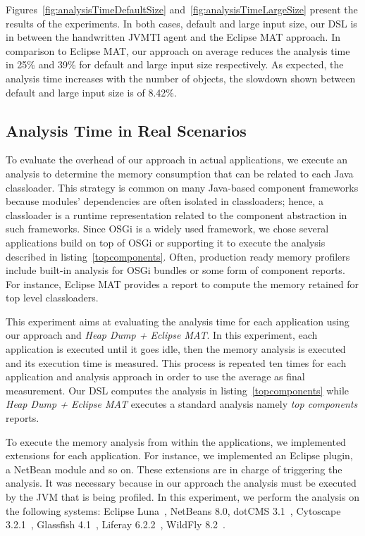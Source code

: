 Figures~\ref{fig:analysisTimeDefaultSize} and~\ref{fig:analysisTimeLargeSize} present the results of the experiments.
In both cases, default and large input size, our DSL is in between the handwritten JVMTI agent and the Eclipse MAT approach.
In comparison to Eclipse MAT, our approach on average reduces the analysis time in 25\% and 39\% for default and large input size respectively.
As expected, the analysis time increases with the number of objects, the slowdown shown between default and large input size is of 8.42\%.

\subsection{Analysis Time in Real Scenarios}
To evaluate the overhead of our approach in actual applications, we execute an analysis to determine the memory consumption that can be related to each Java classloader.
This strategy is common on many Java-based component frameworks because modules' dependencies are often isolated in classloaders; hence, a classloader is a runtime representation related to the component abstraction in such frameworks.
Since OSGi is a widely used framework, we chose several applications build on top of OSGi or supporting it to execute the analysis described in listing~\ref{topcomponents}.
Often, production ready memory profilers include built-in analysis for OSGi bundles or some form of component reports.
For instance, Eclipse MAT provides a report to compute the memory retained for top level classloaders.

This experiment aims at evaluating the analysis time for each application using our approach and \textit{Heap Dump + Eclipse MAT}.
In this experiment, each application is executed until it goes idle, then the memory analysis is executed and its execution time is measured.
This process is repeated ten times for each application and analysis approach in order to use the average as final measurement.
Our DSL computes the analysis in listing~\ref{topcomponents} while \textit{Heap Dump + Eclipse MAT} executes a standard analysis namely \textit{top components} reports.

To execute the memory analysis from within the applications, we implemented extensions for each application. 
For instance, we implemented an Eclipse plugin, a NetBean module and so on.
These extensions are in charge of triggering the analysis.
It was necessary because in our approach the analysis must be executed by the JVM that is being profiled.
In this experiment, we perform the analysis on the following systems: Eclipse Luna~\cite{luna}, NetBeans 8.0\cite{netbeans}, dotCMS 3.1~\cite{dotcms}, Cytoscape 3.2.1~\cite{cytoscape}, Glassfish 4.1~\cite{glassfish},  Liferay 6.2.2~\cite{liferay}, WildFly 8.2~\cite{wildfly}.

